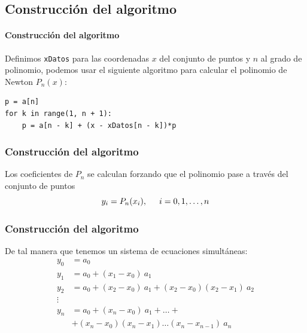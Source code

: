 \subsection{Construcción del algoritmo}
\begin{frame}[fragile]
\framesubtitle{Construcción del algoritmo}
Definimos \texttt{xDatos} para las coordenadas $x$ del conjunto de puntos y $n$ al grado de polinomio, podemos usar el siguiente algoritmo para calcular el polinomio de Newton $P_{n}(x)$:
\begin{lstlisting}[caption=Cálculo del polinomio de Newton,style= FormattedNumber, basicstyle=\linespread{0.9}\ttfamily=\small, columns=fullflexible]
p = a[n]
for k in range(1, n + 1):
    p = a[n - k] + (x - xDatos[n - k])*p
\end{lstlisting}
\end{frame}
\begin{frame}
\frametitle{Construcción del algoritmo}
Los coeficientes de $P_{n}$ se calculan forzando que el polinomio pase a través del conjunto de puntos
\[ y_{i} = P_{n}(x_{i}),\hspace{0.5cm} i = 0, 1, \ldots ,n \]
\end{frame}
\begin{frame}
\frametitle{Construcción del algoritmo}
De tal manera que tenemos un sistema de ecuaciones simultáneas:
\begin{align*}
y_{0} &= a_{0} \\
y_{1} &= a_{0} + (x_{1} - x_{0}) \: a_{1} \\
y_{2} &= a_{0} + (x_{2} - x_{0}) \: a_{1} + (x_{2} - x_{0})(x_{2} - x_{1}) \: a_{2} \\
\vdots \\
y_{n} &= a_{0} + (x_{n} - x_{0}) \: a_{1} + \ldots + \\
&+ (x_{n} - x_{0})(x_{n} - x_{1}) \ldots (x_{n} - x_{n-1}) \: a_{n}
\end{align*}
\end{frame}
